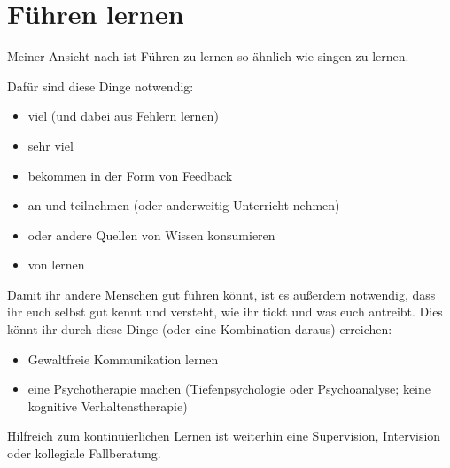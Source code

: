 \section{Führen lernen}
\label{fuehren-lernen}
\label{fuehrung-lernen}

Meiner Ansicht nach ist Führen zu lernen so ähnlich wie singen zu lernen.

Dafür sind diese Dinge notwendig:

\begin{itemize}
    \item viel  (und dabei aus Fehlern lernen)
    \item sehr viel  
    \item {} bekommen in der Form von Feedback  
    \item an  und  teilnehmen (oder anderweitig Unterricht nehmen)
    \item {} oder andere Quellen von Wissen konsumieren
    \item von  lernen
\end{itemize}

Damit ihr andere Menschen gut führen könnt, ist es außerdem notwendig, dass ihr euch selbst gut kennt und versteht, wie ihr tickt und was euch antreibt. Dies könnt ihr durch diese Dinge (oder eine Kombination daraus) erreichen:

\begin{itemize}
    \item Gewaltfreie Kommunikation lernen 
    \item eine Psychotherapie machen (Tiefenpsychologie oder Psychoanalyse; keine kognitive Verhaltenstherapie)  
\end{itemize}

Hilfreich zum kontinuierlichen Lernen ist weiterhin eine Supervision, Intervision oder kollegiale Fallberatung.
